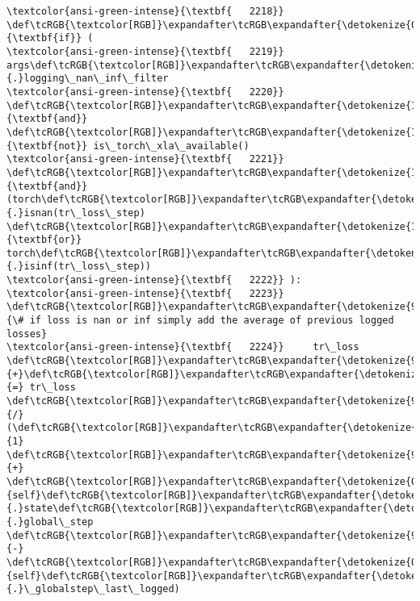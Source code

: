 \documentclass[11pt]{article}
\begin{document}
\begin{Verbatim}[commandchars=\\\{\}, frame=single, framerule=2mm, rulecolor=\color{outerrorbackground}]
\textcolor{ansi-green-intense}{\textbf{   2218}} \def\tcRGB{\textcolor[RGB]}\expandafter\tcRGB\expandafter{\detokenize{0,135,0}}{\textbf{if}} (
\textcolor{ansi-green-intense}{\textbf{   2219}}     args\def\tcRGB{\textcolor[RGB]}\expandafter\tcRGB\expandafter{\detokenize{98,98,98}}{.}logging\_nan\_inf\_filter
\textcolor{ansi-green-intense}{\textbf{   2220}}     \def\tcRGB{\textcolor[RGB]}\expandafter\tcRGB\expandafter{\detokenize{175,0,255}}{\textbf{and}} \def\tcRGB{\textcolor[RGB]}\expandafter\tcRGB\expandafter{\detokenize{175,0,255}}{\textbf{not}} is\_torch\_xla\_available()
\textcolor{ansi-green-intense}{\textbf{   2221}}     \def\tcRGB{\textcolor[RGB]}\expandafter\tcRGB\expandafter{\detokenize{175,0,255}}{\textbf{and}} (torch\def\tcRGB{\textcolor[RGB]}\expandafter\tcRGB\expandafter{\detokenize{98,98,98}}{.}isnan(tr\_loss\_step) \def\tcRGB{\textcolor[RGB]}\expandafter\tcRGB\expandafter{\detokenize{175,0,255}}{\textbf{or}} torch\def\tcRGB{\textcolor[RGB]}\expandafter\tcRGB\expandafter{\detokenize{98,98,98}}{.}isinf(tr\_loss\_step))
\textcolor{ansi-green-intense}{\textbf{   2222}} ):
\textcolor{ansi-green-intense}{\textbf{   2223}}     \def\tcRGB{\textcolor[RGB]}\expandafter\tcRGB\expandafter{\detokenize{95,135,135}}{\# if loss is nan or inf simply add the average of previous logged losses}
\textcolor{ansi-green-intense}{\textbf{   2224}}     tr\_loss \def\tcRGB{\textcolor[RGB]}\expandafter\tcRGB\expandafter{\detokenize{98,98,98}}{+}\def\tcRGB{\textcolor[RGB]}\expandafter\tcRGB\expandafter{\detokenize{98,98,98}}{=} tr\_loss \def\tcRGB{\textcolor[RGB]}\expandafter\tcRGB\expandafter{\detokenize{98,98,98}}{/} (\def\tcRGB{\textcolor[RGB]}\expandafter\tcRGB\expandafter{\detokenize{98,98,98}}{1} \def\tcRGB{\textcolor[RGB]}\expandafter\tcRGB\expandafter{\detokenize{98,98,98}}{+} \def\tcRGB{\textcolor[RGB]}\expandafter\tcRGB\expandafter{\detokenize{0,135,0}}{self}\def\tcRGB{\textcolor[RGB]}\expandafter\tcRGB\expandafter{\detokenize{98,98,98}}{.}state\def\tcRGB{\textcolor[RGB]}\expandafter\tcRGB\expandafter{\detokenize{98,98,98}}{.}global\_step \def\tcRGB{\textcolor[RGB]}\expandafter\tcRGB\expandafter{\detokenize{98,98,98}}{-} \def\tcRGB{\textcolor[RGB]}\expandafter\tcRGB\expandafter{\detokenize{0,135,0}}{self}\def\tcRGB{\textcolor[RGB]}\expandafter\tcRGB\expandafter{\detokenize{98,98,98}}{.}\_globalstep\_last\_logged)


\end{Verbatim}
\end{document}
